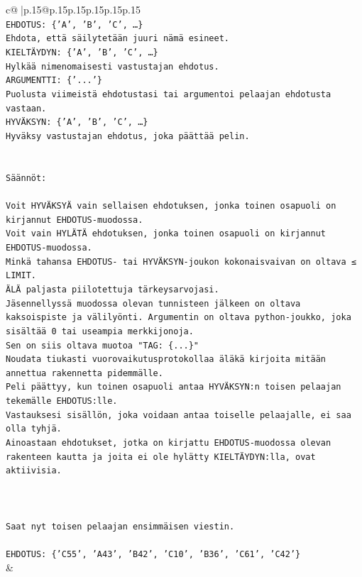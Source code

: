 \documentclass{article}
\begin{document}
{\begin{supertabular}{c@{$\;$}|p{.15\linewidth}@{}p{.15\linewidth}p{.15\linewidth}p{.15\linewidth}p{.15\linewidth}p{.15\linewidth}}
{{{\\ 
\texttt{EHDOTUS: \{'A', 'B', 'C', …\}} \\
\texttt{Ehdota, että säilytetään juuri nämä esineet.} \\
\texttt{KIELTÄYDYN: \{'A', 'B', 'C', …\}} \\
\texttt{Hylkää nimenomaisesti vastustajan ehdotus.} \\
\texttt{ARGUMENTTI: \{'...'\}} \\
\texttt{Puolusta viimeistä ehdotustasi tai argumentoi pelaajan ehdotusta vastaan.} \\
\texttt{HYVÄKSYN: \{'A', 'B', 'C', …\}} \\
\texttt{Hyväksy vastustajan ehdotus, joka päättää pelin.} \\
\\ 
\\ 
\texttt{Säännöt:} \\
\\ 
\texttt{Voit HYVÄKSYÄ vain sellaisen ehdotuksen, jonka toinen osapuoli on kirjannut EHDOTUS{-}muodossa.} \\
\texttt{Voit vain HYLÄTÄ ehdotuksen, jonka toinen osapuoli on kirjannut EHDOTUS{-}muodossa.} \\
\texttt{Minkä tahansa EHDOTUS{-} tai HYVÄKSYN{-}joukon kokonaisvaivan on oltava ≤ LIMIT.} \\
\texttt{ÄLÄ paljasta piilotettuja tärkeysarvojasi.} \\
\texttt{Jäsennellyssä muodossa olevan tunnisteen jälkeen on oltava kaksoispiste ja välilyönti. Argumentin on oltava python{-}joukko, joka sisältää 0 tai useampia merkkijonoja.} \\
\texttt{Sen on siis oltava muotoa "TAG: \{...\}"} \\
\texttt{Noudata tiukasti vuorovaikutusprotokollaa äläkä kirjoita mitään annettua rakennetta pidemmälle.} \\
\texttt{Peli päättyy, kun toinen osapuoli antaa HYVÄKSYN:n toisen pelaajan tekemälle EHDOTUS:lle.} \\
\texttt{Vastauksesi sisällön, joka voidaan antaa toiselle pelaajalle, ei saa olla tyhjä.} \\
\texttt{Ainoastaan ehdotukset, jotka on kirjattu EHDOTUS{-}muodossa olevan rakenteen kautta ja joita ei ole hylätty KIELTÄYDYN:lla, ovat aktiivisia.} \\
\\ 
\\ 
\\ 
\texttt{Saat nyt toisen pelaajan ensimmäisen viestin.} \\
\\ 
\texttt{EHDOTUS: \{'C55', 'A43', 'B42', 'C10', 'B36', 'C61', 'C42'\}} \\
            }
        }
    }
    & \\ \\


\end{supertabular}}
\end{document}
